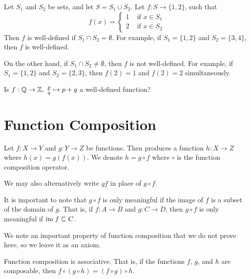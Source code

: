 \begin{example}
    Let $S_1$ and $S_2$ be sets, and let $S = S_1 \cup S_2$. Let $f: S \to \{1, 2\}$, such that
    \[
        f(x) = \begin{cases}
            1 & \textrm{ if } x \in S_1\\
            2 & \textrm{ if } x \in S_2
        \end{cases}
    \]
    Then $f$ is well-defined if $S_1 \cap S_2 = \emptyset$. For example, if $S_1 = \{1, 2\}$ and $S_2 = \{3, 4\}$, then $f$ is well-defined.

    On the other hand, if $S_1 \cap S_2 \neq \emptyset$, then $f$ is not well-defined. For example, if $S_1 = \{1, 2\}$ and $S_2 = \{2, 3\}$, then $f(2) = 1$ and $f(2) = 2$ simultaneously.
\end{example}

\begin{exercise}
    Is $f: \mathbb{Q} \to \mathbb{Z},\;\frac pq \mapsto p + q$ a well-defined function?
\end{exercise}

\newpage

\section{Function Composition}
\begin{definition}
    Let $f: X \to Y$ and $g: Y \to Z$ be functions. Then  produces a function $h: X \to Z$ where $h(x) = g(f(x))$. We denote $h = g \circ f$ where $\circ$ is the function composition operator.
\end{definition}
\begin{remark}
    We may also alternatively write $gf$ in place of $g \circ f$.
\end{remark}

It is important to note that $g \circ f$ is only meaningful if the image of $f$ is a subset of the domain of $g$. That is, if $f: A \to B$ and $g: C \to D$, then $g \circ f$ is only meaningful if $\mathrm{im}\; f \subseteq C$.

We note an important property of function composition that we do not prove here, so we leave it as an axiom.

\begin{axiom}\label{axiom-function-composition-associative}
    Function composition is associative. That is, if the functions $f$, $g$, and $h$ are composable, then $f \circ (g \circ h) = (f \circ g) \circ h$.
\end{axiom}

